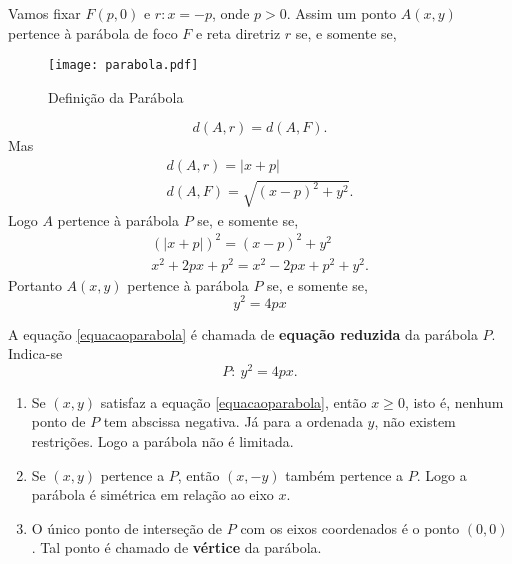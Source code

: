 Vamos fixar $F(p,0)$ e $r: x = -p$, onde $p > 0$. Assim um ponto $A(x,y)$ pertence \`a par\'abola de foco $F$ e reta diretriz $r$ se, e somente se,
\begin{figure}[!h]%
  \centering
  \caption{Defini\c{c}\~ao da Par\'abola}
  \texttt{[image: parabola.pdf]}
\end{figure}

\[
  d(A,r) = d(A,F).
\]
Mas
\begin{align*}
  d(A,r) = |x + p|\\
  d(A,F) = \sqrt{(x - p)^2 + y^2}.
\end{align*}
Logo $A$ pertence \`a par\'abola $P$ se, e somente se,
\begin{align*}
  (|x + p|)^2 = (x - p)^2 + y^2\\
  x^2 + 2px + p^2 = x^2 - 2px + p^2 + y^2.
\end{align*}
Portanto $A(x,y)$ pertence \`a par\'abola $P$ se, e somente se,
\begin{equation}\label{equacaoparabola}
  y^2 = 4px
\end{equation}

A equa\c{c}\~ao \eqref{equacaoparabola} \'e chamada de \textbf{equa\c{c}\~ao reduzida} da par\'abola $P$. Indica-se
\[
  P:\ y^2 = 4px.
\]

\begin{observacao}
  \begin{enumerate}
    \item Se $(x,y)$ satisfaz a equa\c{c}\~ao \eqref{equacaoparabola}, ent\~ao $x \ge 0$, isto \'e, nenhum ponto de $P$ tem abscissa negativa. J\'a para a ordenada $y$, n\~ao existem restri\c{c}\~oes. Logo a par\'abola n\~ao \'e limitada.
    \item Se $(x,y)$ pertence a $P$, ent\~ao $(x,-y)$ tamb\'em pertence a $P$. Logo a par\'abola \'e sim\'etrica em rela\c{c}\~ao ao eixo $x$.
    \item O \'unico ponto de interse\c{c}\~ao de $P$ com os eixos coordenados \'e o ponto $(0,0)$. Tal ponto \'e chamado de \textbf{v\'ertice} da par\'abola.
  \end{enumerate}
\end{observacao}

